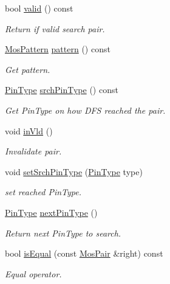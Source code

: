 \begin{DoxyCompactItemize}
bool \hyperlink{classMosPair_a16696e5a4fa38118f88549dfc782ac22}{valid} () const
\begin{DoxyCompactList}\small\item\em Return if valid search pair. \end{DoxyCompactList}\item 
\hyperlink{type_8h_af19eddb079bfea723256710b029c38e8}{Mos\+Pattern} \hyperlink{classMosPair_a342efc591b339fc9d08ad468d7399dd9}{pattern} () const
\begin{DoxyCompactList}\small\item\em Get pattern. \end{DoxyCompactList}\item 
\hyperlink{type_8h_afaab50027002ecbb6c8ac27e727d1bb4}{Pin\+Type} \hyperlink{classMosPair_a85a281d835a1046346b621ac6c3c6770}{srch\+Pin\+Type} () const
\begin{DoxyCompactList}\small\item\em Get Pin\+Type on how D\+FS reached the pair. \end{DoxyCompactList}\item 
void \hyperlink{classMosPair_a3064a984676f0bd8e6d380a050bd2152}{in\+Vld} ()
\begin{DoxyCompactList}\small\item\em Invalidate pair. \end{DoxyCompactList}\item 
void \hyperlink{classMosPair_a133614566bf03ab4b37aced8169aee87}{set\+Srch\+Pin\+Type} (\hyperlink{type_8h_afaab50027002ecbb6c8ac27e727d1bb4}{Pin\+Type} type)
\begin{DoxyCompactList}\small\item\em set reached Pin\+Type. \end{DoxyCompactList}\item 
\hyperlink{type_8h_afaab50027002ecbb6c8ac27e727d1bb4}{Pin\+Type} \hyperlink{classMosPair_a6c0bf6ad66a5076dc19a48a8d038d044}{next\+Pin\+Type} ()
\begin{DoxyCompactList}\small\item\em Return next Pin\+Type to search. \end{DoxyCompactList}\item 
bool \hyperlink{classMosPair_a4e4d694485bcc5c7c14981abef32774c}{is\+Equal} (const \hyperlink{classMosPair}{Mos\+Pair} \&right) const
\begin{DoxyCompactList}\small\item\em Equal operator. \end{DoxyCompactList}\end{DoxyCompactItemize}
